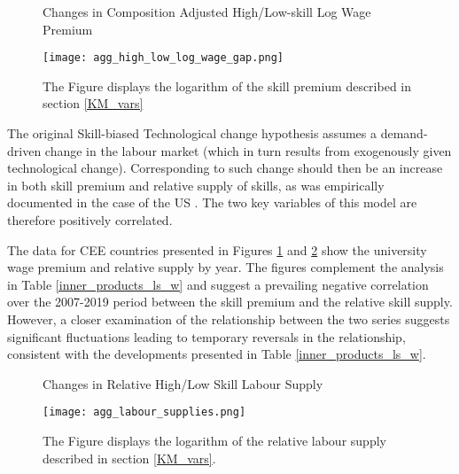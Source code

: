 \documentclass[11pt]{article}
\begin{document}
\begin{figure}[!htbp]%
    \centering
    \caption{Changes in Composition Adjusted High/Low-skill Log Wage Premium}
    {\texttt{[image: agg\_high\_low\_log\_wage\_gap.png]} }
    \label{agg_high_low_log_wage_gap}
    \caption*{\footnotesize The Figure displays the logarithm of the skill premium described in section \ref{KM_vars}}
\end{figure}

The original Skill-biased Technological change hypothesis assumes a demand-driven change in the labour market (which in turn results from exogenously given technological change). Corresponding to such change should then be an increase in both skill premium and relative supply of skills, as was empirically documented in the case of the US \citep{acemoglu2011skills}. The two key variables of this model are therefore positively correlated. 

The data for CEE countries presented in Figures \ref{agg_high_low_log_wage_gap} and \ref{agg_labour_supplies} show the university wage premium and relative supply by year. The figures complement the analysis in Table \ref{inner_products_ls_w} and suggest a prevailing negative correlation over the 2007-2019 period between the skill premium and the relative skill supply. However, a closer examination of the relationship between the two series suggests significant fluctuations leading to temporary reversals in the relationship, consistent with the developments presented in Table \ref{inner_products_ls_w}.


\begin{figure}[!htbp]%
    \centering
    \caption{Changes in Relative High/Low Skill Labour Supply}
    {\texttt{[image: agg\_labour\_supplies.png]} }
    \label{agg_labour_supplies}
    \caption*{\footnotesize The Figure displays the logarithm of the relative labour supply described in section \ref{KM_vars}.}
\end{figure}
\end{document}
